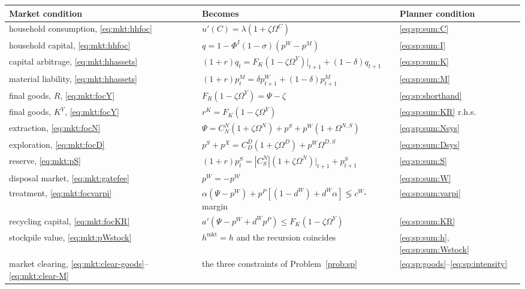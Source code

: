 \begin{center}
\begin{tabular}{lll}
\toprule
Market condition & Becomes & Planner condition \\
\midrule
household consumption, \eqref{eq:mkt:hhfoc} & $u'\left(C\right)=\lambda\left(1+\zeta\Omega^C\right)$ & \eqref{eq:sp:sum:C} \\
household capital, \eqref{eq:mkt:hhfoc} & $q=1-\Phi^I\left(1-\sigma\right)\left(p^W-p^M\right)$ & \eqref{eq:sp:sum:I} \\
capital arbitrage, \eqref{eq:mkt:hhassets} & $\left(1+r\right)q_t=F_K\left(1-\zeta\Omega^Y\right)|_{t+1}+\left(1-\delta\right)q_{t+1}$ & \eqref{eq:sp:sum:K} \\
material liability, \eqref{eq:mkt:hhassets} & $\left(1+r\right)p^M_t=\delta p^W_{t+1}+\left(1-\delta\right)p^M_{t+1}$ & \eqref{eq:sp:sum:M} \\
final goods, $R$, \eqref{eq:mkt:focY} & $F_R\left(1-\zeta\Omega^Y\right)=\Psi-\zeta$ & \eqref{eq:sp:shorthand} \\
final goods, $K^Y$, \eqref{eq:mkt:focY} & $r^K=F_K\left(1-\zeta\Omega^Y\right)$ & \eqref{eq:sp:sum:KR} r.h.s. \\
extraction, \eqref{eq:mkt:focN} & $\Psi=C^N_N\left(1+\zeta\Omega^N\right)+p^S+p^W\left(1+\Omega^{N,S}\right)$ & \eqref{eq:sp:sum:Nsys} \\
exploration, \eqref{eq:mkt:focD} & $p^S+p^X=C^D_D\left(1+\zeta\Omega^D\right)+p^W\Omega^{D,S}$ & \eqref{eq:sp:sum:Dsys} \\
reserve, \eqref{eq:mkt:pS} & $\left(1+r\right)p^S_t=\left|C^N_S\right|\left(1+\zeta\Omega^N\right)|_{t+1}+p^S_{t+1}$ & \eqref{eq:sp:sum:S} \\
disposal market, \eqref{eq:mkt:gatefee} & $p^W=-p^{\mathcal W}$ & \eqref{eq:sp:sum:W} \\
treatment, \eqref{eq:mkt:focvarpi} & $\alpha\left(\Psi-p^W\right)+p^P\left[\left(1-d^W\right)+d^W\alpha\right]\lessgtr c^W$-margin & \eqref{eq:sp:sum:varpi} \\
recycling capital, \eqref{eq:mkt:focKR} & $a'\left(\Psi-p^W+d^Wp^P\right)\le F_K\left(1-\zeta\Omega^Y\right)$ & \eqref{eq:sp:sum:KR} \\
stockpile value, \eqref{eq:mkt:pWstock} & $h^{\mathrm{mkt}}=h$ and the recursion coincides & \eqref{eq:sp:sum:h}, \eqref{eq:sp:sum:Wstock} \\
market clearing, \eqref{eq:mkt:clear-goods}--\eqref{eq:mkt:clear-M} & the three constraints of Problem~\ref{prob:sp} & \eqref{eq:sp:goods}--\eqref{eq:sp:intensity} \\
\bottomrule
\end{tabular}
\end{center}

